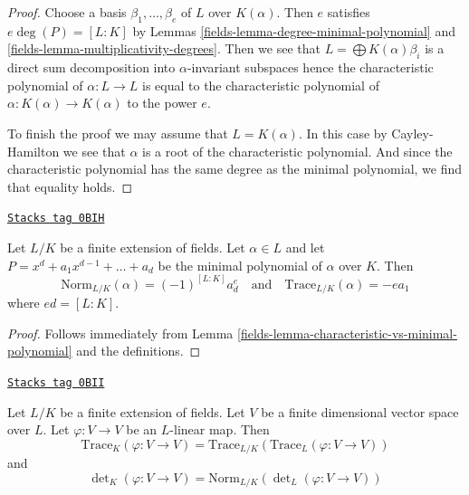 \begin{proof}

Choose a basis $\beta_1, \ldots, \beta_e$ of $L$ over $K(\alpha)$.
Then $e$ satisfies $e \deg(P) = [L : K]$ by
Lemmas \ref{fields-lemma-degree-minimal-polynomial} and
\ref{fields-lemma-multiplicativity-degrees}.
Then we see that $L = \bigoplus K(\alpha) \beta_i$ is a
direct sum decomposition into $\alpha$-invariant subspaces
hence the characteristic polynomial of $\alpha : L \to L$
is equal to the characteristic polynomial of
$\alpha : K(\alpha) \to K(\alpha)$ to the power $e$.

\medskip\noindent
To finish the proof we may assume that $L = K(\alpha)$.
In this case by Cayley-Hamilton we see that $\alpha$
is a root of the characteristic polynomial. And since the
characteristic polynomial has the same degree as the minimal
polynomial, we find that equality holds.
\end{proof}

\begin{lemma}
\label{fields-lemma-trace-and-norm-from-minimal-polynomial}
\href{https://stacks.math.columbia.edu/tag/0BIH}{\texttt{Stacks tag 0BIH}}

Let $L/K$ be a finite extension of fields. Let $\alpha \in L$ and let
$P = x^d + a_1 x^{d - 1} + \ldots + a_d$
be the minimal polynomial of $\alpha$ over $K$. Then
$$
\text{Norm}_{L/K}(\alpha) = (-1)^{[L : K]} a_d^e
\quad\text{and}\quad
\text{Trace}_{L/K}(\alpha) = - e a_1
$$
where $e d = [L : K]$.
\end{lemma}

\begin{proof}

Follows immediately from Lemma \ref{fields-lemma-characteristic-vs-minimal-polynomial}
and the definitions.
\end{proof}

\begin{lemma}
\label{fields-lemma-trace-and-norm-linear}
\href{https://stacks.math.columbia.edu/tag/0BII}{\texttt{Stacks tag 0BII}}

Let $L/K$ be a finite extension of fields. Let $V$ be a finite dimensional
vector space over $L$. Let $\varphi : V \to V$ be an $L$-linear map.
Then
$$
\text{Trace}_K(\varphi : V \to V) =
\text{Trace}_{L/K}(\text{Trace}_L(\varphi : V \to V))
$$
and
$$
\det\nolimits_K(\varphi : V \to V) =
\text{Norm}_{L/K}(\det\nolimits_L(\varphi : V \to V))
$$
\end{lemma}

